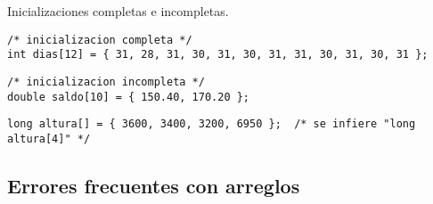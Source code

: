 \begin{ejemplo}
Inicializaciones completas e incompletas.
\begin{lstlisting}
/* inicializacion completa */
int dias[12] = { 31, 28, 31, 30, 31, 30, 31, 31, 30, 31, 30, 31 };   
\end{lstlisting}
\begin{lstlisting}
/* inicializacion incompleta */
double saldo[10] = { 150.40, 170.20 };     
\end{lstlisting}
\begin{lstlisting}
long altura[] = { 3600, 3400, 3200, 6950 };  /* se infiere "long altura[4]" */
\end{lstlisting}
\end{ejemplo}

\subsection{Errores frecuentes con arreglos}

